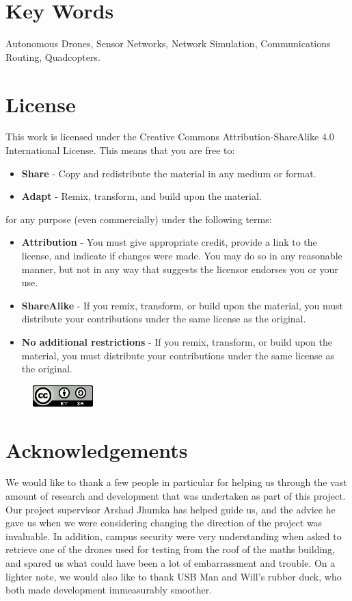 \section{Key Words}
Autonomous Drones, Sensor Networks, Network Simulation, Communications Routing, Quadcopters.

\section{License}
This work is licensed under the Creative Commons Attribution-ShareAlike 4.0 International License. This means that you are free to:

\begin{itemize}
	\item \textbf{Share} - Copy and redistribute the material in any medium or format.
	\item \textbf{Adapt} - Remix, transform, and build upon the material.
\end{itemize}

for any purpose (even commercially) under the following terms: 

\begin{itemize}
	\item \textbf{Attribution} -  You must give appropriate credit, provide a link to the license, and indicate if changes were made. You may do so in any reasonable manner, but not in any way that suggests the licensor endorses you or your use.
	\item \textbf{ShareAlike} - If you remix, transform, or build upon the material, you must distribute your contributions under the same license as the original.
	\item \textbf{No additional restrictions} - If you remix, transform, or build upon the material, you must distribute your contributions under the same license as the original.
\end{itemize}

\begin{figure}[H]
	\centering
	\includegraphics[scale=1]{img/license}
\end{figure}

\section{Acknowledgements}
We would like to thank a few people in particular for helping us through the vast amount of research and development that was undertaken as part of this project. Our project supervisor Arshad Jhumka has helped guide us, and the advice he gave us when we were considering changing the direction of the project was invaluable. In addition, campus security were very understanding when asked to retrieve one of the drones used for testing from the roof of the maths building, and spared us what could have been a lot of embarrassment and trouble. On a lighter note, we would also like to thank USB Man and Will's rubber duck, who both made development immeasurably smoother.

